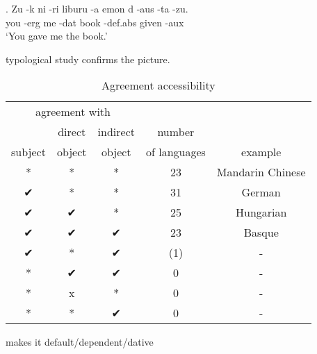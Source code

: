 \exg. Zu -k ni -ri liburu -a emon d -aus -ta -zu.\\
 you -\ac{erg} me -\ac{dat} book -\ac{def}.\ac{abs} given  -\ac{aux}  \\
 `You gave me the book.' \label{ex:basqueagr}

 typological study confirms the picture.

 \begin{table}[H]
   \center
   \caption {Agreement accessibility}
     \begin{tabular}[t]{ccccc}
       \toprule
             \multicolumn{3}{c}{agreement with}
             &
           & \\
       \cmidrule{1-3}
             & direct
             & indirect
             & number
           & \\
             subject
             & object
             & object
             & of languages
           & example \\
       \cmidrule{1-3} \cmidrule{4-4} \cmidrule{5-5}
             *
             & *
             & *
             & 23
           & Mandarin Chinese \\
             ✔
             & *
             & *
             & 31
           & German \\
             ✔
             & ✔
             & *
             & 25
           & Hungarian \\
             ✔
             & ✔
             & ✔
             & 23
           & Basque \\
             ✔
             & *
             & ✔
             & (1)
           & - \\
             {*}
             & ✔
             & ✔
             & 0
           & - \\
             {*}
             & x
             & *
             & 0
           & - \\
             {*}
             & *
             & ✔
             & 0
           & - \\
       \bottomrule
     \end{tabular}
 \end{table}

\citealt{bobaljik2006} makes it default/dependent/dative

